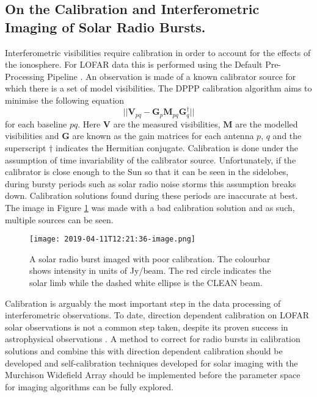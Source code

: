\subsection{On the Calibration and Interferometric Imaging of Solar Radio Bursts.}
Interferometric visibilities require calibration in order to account for the effects of the ionosphere. For LOFAR data this is performed using the Default Pre-Processing Pipeline \citep[DPPP;][]{VanDiepen2018}. An observation is made of a known calibrator source for which there is a set of model visibilities. The DPPP calibration algorithm aims to minimise the following equation
\begin{equation}
\label{eq:gain}
\vert \vert \mathbf{V}_{pq} - \mathbf{G}_p \mathbf{M}_{pq} \mathbf{G}^\dag_q \vert \vert
\end{equation}
for each baseline $pq$. Here $\mathbf{V}$ are the measured visibilities, $\mathbf{M}$ are the modelled visibilities and $\mathbf{G}$ are known as the gain matrices for each antenna $p$, $q$ and the superscript $\dag$ indicates the Hermitian conjugate. Calibration is done under the assumption of time invariability of the calibrator source. Unfortunately, if the calibrator is close enough to the Sun so that it can be seen in the sidelobes, during bursty periods such as solar radio noise storms this assumption breaks down. Calibration solutions found during these periods are inaccurate at best. The image in Figure \ref{fig:bad_cal} was made with a bad calibration solution and as such, multiple sources can be seen.

\begin{figure}[ht]
\centering
\texttt{[image: 2019-04-11T12:21:36-image.png]}
\caption[An example of a solar radio burst imaged with poor calibration.]{A solar radio burst imaged with poor calibration. The colourbar shows intensity in units of Jy/beam. The red circle indicates the solar limb while the dashed white ellipse is the CLEAN beam.}
\label{fig:bad_cal}
\end{figure}

Calibration is arguably the most important step in the data processing of interferometric observations. To date, direction dependent calibration on LOFAR solar observations is not a common step taken, despite its proven success in astrophysical observations \citep{DeGasperin2019}. A method to correct for radio bursts in calibration solutions and combine this with direction dependent calibration should be developed  and self-calibration techniques developed for solar imaging with the Murchison Widefield Array \citep[MWA;][]{Mondal2019} should be implemented before the parameter space for imaging algorithms can be fully explored. 

